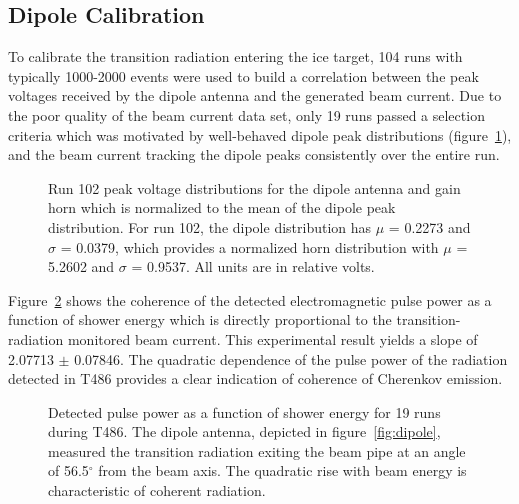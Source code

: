 \subsection{Dipole Calibration}
\label{ss:dipoleCal}
To calibrate the transition radiation entering the ice target, 104 runs with typically 1000-2000 events were used to build a correlation between the peak voltages received by the dipole antenna and the generated beam current.  Due to the poor quality of the beam current data set, only 19 runs passed a selection criteria which was motivated by well-behaved dipole peak distributions (figure~\ref{fig:dipHrnDist}), and the beam current tracking the dipole peaks consistently over the entire run.  

\begin{figure}[htbp]
\centering
\epsfxsize=4.5in
\caption{Run 102 peak voltage distributions for the dipole antenna and gain horn which is normalized to the mean of the dipole peak distribution.  For run 102, the dipole distribution has $\mu$ = 0.2273 and $\sigma$ = 0.0379, which provides a normalized horn distribution with $\mu$ = 5.2602 and $\sigma$ = 0.9537.  All units are in relative volts.}
\label{fig:dipHrnDist}
\end{figure}

\par Figure~\ref{fig:dipoleCal} shows the coherence of the detected electromagnetic pulse power as a function of shower energy which is directly proportional to the transition-radiation monitored beam current.  This experimental result yields a slope of 2.07713 $\pm$ 0.07846.  The quadratic dependence of the pulse power of the radiation detected in T486 provides a clear indication of coherence of Cherenkov emission.

\begin{figure}[htbp]
\centering
\epsfxsize=4.5in
\caption{Detected pulse power as a function of shower energy for 19 runs during T486.  The dipole antenna, depicted in figure~\ref{fig:dipole}, measured the transition radiation exiting the beam pipe at an angle of 56.5$^\circ$ from the beam axis.  The quadratic rise with beam energy is characteristic of coherent radiation.}
\label{fig:dipoleCal}
\end{figure}